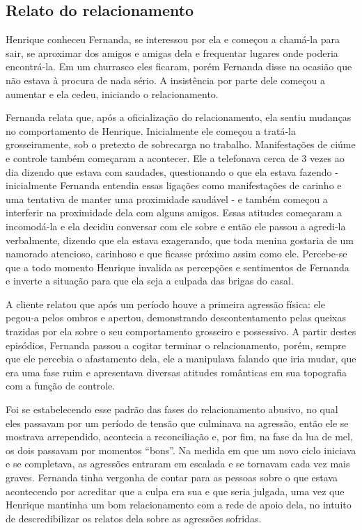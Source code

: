 \subsection{Relato do relacionamento}

Henrique conheceu Fernanda, se interessou por ela e começou a chamá-la para sair, se aproximar dos amigos e amigas dela e frequentar lugares onde poderia encontrá-la. Em um churrasco eles ficaram, porém Fernanda disse na ocasião que não estava à procura de nada sério. A insistência por parte dele começou a aumentar e ela cedeu, iniciando o relacionamento.

Fernanda relata que, após a oficialização do relacionamento, ela sentiu mudanças no comportamento de Henrique. Inicialmente ele começou a tratá-la grosseiramente, sob o pretexto de sobrecarga no trabalho. Manifestações de ciúme e controle também começaram a acontecer. Ele a telefonava cerca de 3 vezes ao dia dizendo que estava com saudades, questionando o que ela estava fazendo - inicialmente Fernanda entendia essas ligações como manifestações de carinho e uma tentativa de manter uma proximidade saudável - e também começou a interferir na proximidade dela com alguns amigos. Essas atitudes começaram a incomodá-la e ela decidiu conversar com ele sobre e então ele passou a agredi-la verbalmente, dizendo que ela estava exagerando, que toda menina gostaria de um namorado atencioso, carinhoso e que ficasse próximo assim como ele. Percebe-se que a todo momento Henrique invalida as percepções e sentimentos de Fernanda e inverte a situação para que ela seja a culpada das brigas do casal.

A cliente relatou que após um período houve a primeira agressão física: ele pegou-a pelos ombros e apertou, demonstrando descontentamento pelas queixas trazidas por ela sobre o seu comportamento grosseiro e possessivo. A partir destes episódios, Fernanda passou a cogitar terminar o relacionamento, porém, sempre que ele percebia o afastamento dela, ele a manipulava falando que iria mudar, que era uma fase ruim e apresentava diversas atitudes românticas em sua topografia com a função de controle.

Foi se estabelecendo esse padrão das fases do relacionamento abusivo, no qual eles passavam por um período de tensão que culminava na agressão, então ele se mostrava arrependido, acontecia a reconciliação e, por fim, na fase da lua de mel, os dois passavam por momentos ``bons''. Na medida em que um novo ciclo iniciava e se completava, as agressões entraram em escalada e se tornavam cada vez mais graves. Fernanda tinha vergonha de contar para as pessoas sobre o que estava acontecendo por acreditar que a culpa era sua e que seria julgada, uma vez que Henrique mantinha um bom relacionamento com a rede de apoio dela, no intuito de descredibilizar os relatos dela sobre as agressões sofridas. 

